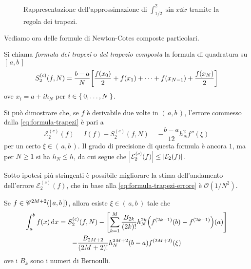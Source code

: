 	\begin{figure}[tpb]
		\centering
		
		\caption{Rappresentazione dell'approssimazione di \(\int_{1 / 2}^2 \sin x \dd{x}\) tramite la regola dei trapezi.}
	\end{figure}

	Vediamo ora delle formule di Newton-Cotes composte particolari.
	
	\begin{definizione}
		Si chiama \emph{formula dei trapezi} o \emph{del trapezio composta} la formula di quadratura su \([\, a, b \,]\)
		\begin{equation}\label{eq:formula-trapezi}
			S_2^{(c)} (f, N) = \frac{b - a}{N} \qty[\frac{f (x_0)}{2} + f (x_1) + \dots + f (x_{N - 1}) + \frac{f (x_N)}{2}]
		\end{equation}
		ove \(x_i = a + i h_N\) per \(i \in \Set{0, \dots, N}\).
	\end{definizione}

	Si può dimostrare che, se \(f\) è derivabile due volte in \((\, a, b \,)\), l'errore commesso dalla \eqref{eq:formula-trapezi} è pari a
	\begin{equation}\label{eq:formula-trapezi-errore}
		\mathcal{E}_2^{(c)} (f) = I (f) - S_2^{(c)} (f, N) = - \frac{b - a}{12} h_N^2 f'' (\xi)
	\end{equation}
	per un certo \(\xi \in (\, a, b \,)\). Il grado di precisione di questa formula è ancora \(1\), ma per \(N \ge 1\) si ha \(h_N \le h\), da cui segue che \(\abs{\mathcal{E}_2^{(c)} (f)} \le \abs{\mathcal{E}_2 (f)}\).
	
	Sotto ipotesi piú stringenti è possibile migliorare la stima dell'andamento dell'errore \(\mathcal{E}_2^{(c)} (f)\), che in base alla \eqref{eq:formula-trapezi-errore} è \(\mathcal{O} (1 / N^2)\).
	
	\begin{teorema}
		Se \(f \in \mathscr{C}^{2 M + 2} ([\, a, b \,])\), allora esiste \(\xi \in (\, a, b \,)\) tale che
		\begin{multline}\label{eq:formula-eulero-maclaurin}
			\int_a^b f (x) \dd{x} = S_2^{(c)} (f, N) - \qty[\sum_{k = 1}^M \frac{B_{2 k}}{(2 k)!} h_N^{2 k} \qty(f^{(2 k - 1)} (b) - f^{(2 k - 1)}) (a)] \\
			- \frac{B_{2 M + 2}}{(2 M + 2)!} h_N^{2 M + 2} (b - a) f^{(2 M + 2)} (\xi)
		\end{multline}
		ove i \(B_k\) sono i numeri di Bernoulli.
	\end{teorema}

